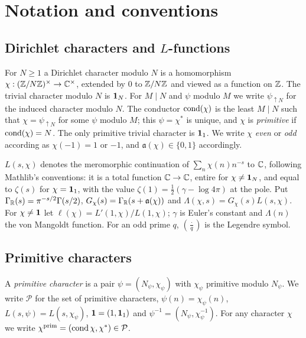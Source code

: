 \section{Notation and conventions}\label{sec:prelim}

\subsection{Dirichlet characters and \texorpdfstring{$L$}{L}-functions}
For $N\ge1$ a Dirichlet character modulo $N$ is a homomorphism $\chi:(\mathbb{Z}/N\mathbb{Z})^\times\to\mathbb{C}^\times$,
extended by $0$ to $\mathbb{Z}/N\mathbb{Z}$ and viewed as a function on $\mathbb{Z}$. The trivial character modulo $N$ is
$\mathbf{1}_N$. For $M\mid N$ and $\psi$ modulo $M$ we write $\psi_{\uparrow N}$ for the induced character
modulo $N$. The conductor $\operatorname{cond}(\chi)$ is the least $M\mid N$ such that $\chi=\psi_{\uparrow N}$ for
some $\psi$ modulo $M$; this $\psi=\chi^*$ is unique, and $\chi$ is \emph{primitive} if
$\operatorname{cond}(\chi)=N$. The only primitive trivial character is $\mathbf{1}_1$. We write $\chi$ \emph{even} or
\emph{odd} according as $\chi(-1)=1$ or $-1$, and $\mathfrak a(\chi)\in\{0,1\}$ accordingly.

$L(s,\chi)$ denotes the meromorphic continuation of $\sum_n\chi(n)n^{-s}$ to $\mathbb{C}$, following
Mathlib's conventions: it is a total function $\mathbb{C}\to\mathbb{C}$, entire for $\chi\ne\mathbf{1}_N$, and equal to
$\zeta(s)$ for $\chi=\mathbf{1}_1$, with the value $\zeta(1)=\frac12(\gamma-\log 4\pi)$ at the pole.
Put $\Gamma_{\mathbb{R}}(s)=\pi^{-s/2}\Gamma(s/2)$, $G_\chi(s)=\Gamma_{\mathbb{R}}(s+\mathfrak a(\chi))$ and
$\Lambda(\chi,s)=G_\chi(s)L(s,\chi)$. For $\chi\ne\mathbf{1}$ let
$\ell(\chi)=L'(1,\chi)/L(1,\chi)$; $\gamma$ is Euler's constant and $\Lambda(n)$ the von Mangoldt
function. For an odd prime $q$, $(\frac{\cdot}{q})$ is the Legendre symbol.

\subsection{Primitive characters}
A \emph{primitive character} is a pair $\psi=(N_\psi,\chi_\psi)$ with $\chi_\psi$ primitive modulo
$N_\psi$. We write $\mathcal P$ for the set of primitive characters, $\psi(n)=\chi_\psi(n)$,
$L(s,\psi)=L(s,\chi_\psi)$, $\mathbf{1}=(1,\mathbf{1}_1)$ and $\psi^{-1}=(N_\psi,\chi_\psi^{-1})$. For any character
$\chi$ we write $\chi^{\rm prim}=(\operatorname{cond}\chi,\chi^*)\in\mathcal P$.

